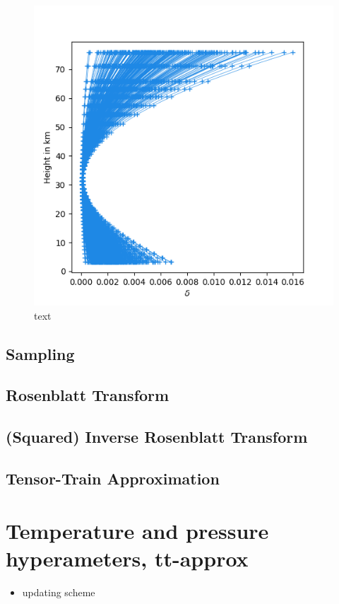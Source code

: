 \begin{figure}[h]
	\centering
	\includegraphics[width=\textwidth]{DeltaSamp.png}
	\caption[]{text}
	\label{fig:Results}
\end{figure}
\subsection{Sampling}

\subsection{ Rosenblatt Transform}
\subsection{(Squared) Inverse Rosenblatt Transform}
\subsection{Tensor-Train Approximation}

\section{Temperature and pressure hyperameters, tt-approx}

\begin{itemize}
	\item updating scheme
\end{itemize}

